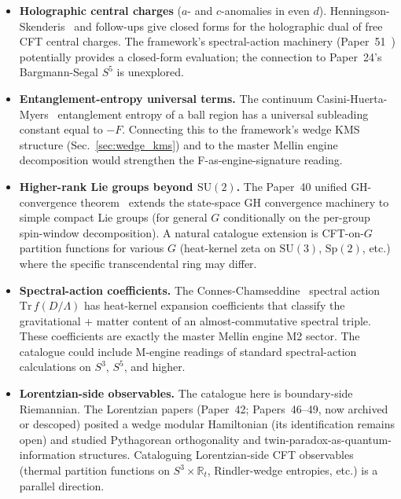 \documentclass[11pt,a4paper]{article}
\theoremstyle{plain}
\theoremstyle{definition}
\newcommand{\sthree}{S^{3}}
\begin{document}
\begin{itemize}
\item \textbf{Holographic central charges} ($a$- and $c$-anomalies in
even $d$). Henningson-Skenderis~\cite{henningson_skenderis1998} and
follow-ups give closed forms for the holographic dual of free CFT
central charges. The framework's spectral-action machinery
(Paper~51~\cite{paper51}) potentially provides a closed-form
evaluation; the connection to Paper~24's Bargmann-Segal $S^{5}$ is
unexplored.

\item \textbf{Entanglement-entropy universal terms.} The continuum
Casini-Huerta-Myers~\cite{casini_huerta_myers2011} entanglement
entropy of a ball region has a universal subleading constant equal
to $-F$. Connecting this to the framework's wedge KMS structure
(Sec.~\ref{sec:wedge_kms}) and to the master Mellin engine
decomposition would strengthen the F-as-engine-signature reading.

\item \textbf{Higher-rank Lie groups beyond $\mathrm{SU}(2)$.} The
Paper~40 unified GH-convergence theorem~\cite{paper40} extends the
state-space GH convergence machinery to simple compact Lie groups
(for general $G$ conditionally on the per-group spin-window decomposition). A natural
catalogue extension is CFT-on-$G$ partition functions for various
$G$ (heat-kernel zeta on $\mathrm{SU}(3)$, $\mathrm{Sp}(2)$, etc.)
where the specific transcendental ring may differ.

\item \textbf{Spectral-action coefficients.} The
Connes-Chamseddine~\cite{chamseddine_connes1997} spectral action
$\mathrm{Tr}\,f(D/\Lambda)$ has heat-kernel expansion coefficients
that classify the gravitational + matter content of an
almost-commutative spectral triple. These coefficients are exactly
the master Mellin engine M2 sector. The catalogue could include
M-engine readings of standard spectral-action calculations on
$\sthree$, $S^{5}$, and higher.

\item \textbf{Lorentzian-side observables.} The catalogue here is
boundary-side Riemannian. The Lorentzian papers (Paper~42; Papers~46--49,
now archived or descoped) posited a wedge modular Hamiltonian (its
identification remains open) and studied Pythagorean orthogonality and
twin-paradox-as-quantum-information structures. Cataloguing
Lorentzian-side CFT observables (thermal partition functions on
$\sthree \times \mathbb{R}_{t}$, Rindler-wedge entropies, etc.) is a
parallel direction.
\end{itemize}
\end{document}
